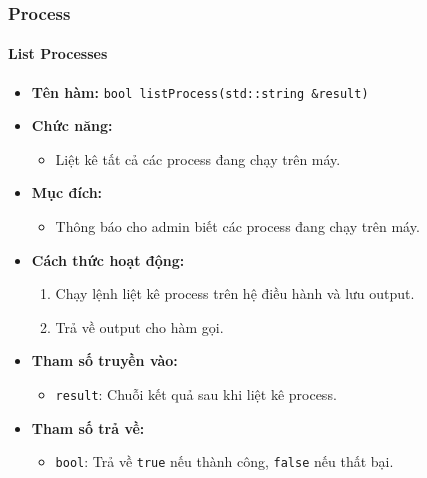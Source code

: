 \subsubsection{Process}
\label{subsec:process}

\paragraph{List Processes}
\begin{itemize}
    \item \textbf{Tên hàm:} \texttt{bool listProcess(std::string \&result)}
    \item \textbf{Chức năng:}
    \begin{itemize}
        \item Liệt kê tất cả các process đang chạy trên máy.
    \end{itemize}
    \item \textbf{Mục đích:}
    \begin{itemize}
        \item Thông báo cho admin biết các process đang chạy trên máy.
    \end{itemize}
    \item \textbf{Cách thức hoạt động:}
    \begin{enumerate}
        \item Chạy lệnh liệt kê process trên hệ điều hành và lưu output.
        \item Trả về output cho hàm gọi.
    \end{enumerate}
    \item \textbf{Tham số truyền vào:}
    \begin{itemize}
        \item \texttt{result}: Chuỗi kết quả sau khi liệt kê process.
    \end{itemize}
    \item \textbf{Tham số trả về:}
    \begin{itemize}
        \item \texttt{bool}: Trả về \texttt{true} nếu thành công, \texttt{false} nếu thất bại.
    \end{itemize}
\end{itemize}

